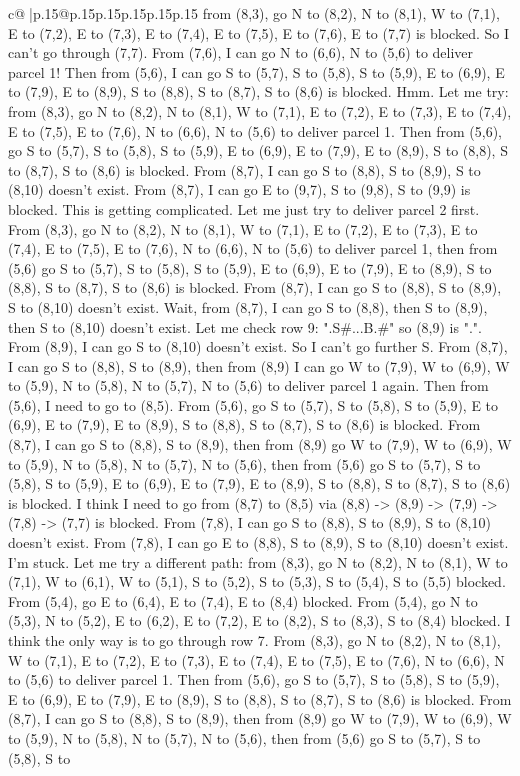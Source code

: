 \documentclass{article}
\begin{document}
{\begin{supertabular}{c@{$\;$}|p{.15\linewidth}@{}p{.15\linewidth}p{.15\linewidth}p{.15\linewidth}p{.15\linewidth}p{.15\linewidth}}
{{{from (8,3), go N to (8,2), N to (8,1), W to (7,1), E to (7,2), E to (7,3), E to (7,4), E to (7,5), E to (7,6), E to (7,7) is blocked. So I can't go through (7,7). From (7,6), I can go N to (6,6), N to (5,6) to deliver parcel 1! Then from (5,6), I can go S to (5,7), S to (5,8), S to (5,9), E to (6,9), E to (7,9), E to (8,9), S to (8,8), S to (8,7), S to (8,6) is blocked. Hmm. Let me try: from (8,3), go N to (8,2), N to (8,1), W to (7,1), E to (7,2), E to (7,3), E to (7,4), E to (7,5), E to (7,6), N to (6,6), N to (5,6) to deliver parcel 1. Then from (5,6), go S to (5,7), S to (5,8), S to (5,9), E to (6,9), E to (7,9), E to (8,9), S to (8,8), S to (8,7), S to (8,6) is blocked. From (8,7), I can go S to (8,8), S to (8,9), S to (8,10) doesn't exist. From (8,7), I can go E to (9,7), S to (9,8), S to (9,9) is blocked. This is getting complicated. Let me just try to deliver parcel 2 first. From (8,3), go N to (8,2), N to (8,1), W to (7,1), E to (7,2), E to (7,3), E to (7,4), E to (7,5), E to (7,6), N to (6,6), N to (5,6) to deliver parcel 1, then from (5,6) go S to (5,7), S to (5,8), S to (5,9), E to (6,9), E to (7,9), E to (8,9), S to (8,8), S to (8,7), S to (8,6) is blocked. From (8,7), I can go S to (8,8), S to (8,9), S to (8,10) doesn't exist. Wait, from (8,7), I can go S to (8,8), then S to (8,9), then S to (8,10) doesn't exist. Let me check row 9: ".S\#...B.\#" so (8,9) is ".". From (8,9), I can go S to (8,10) doesn't exist. So I can't go further S. From (8,7), I can go S to (8,8), S to (8,9), then from (8,9) I can go W to (7,9), W to (6,9), W to (5,9), N to (5,8), N to (5,7), N to (5,6) to deliver parcel 1 again. Then from (5,6), I need to go to (8,5). From (5,6), go S to (5,7), S to (5,8), S to (5,9), E to (6,9), E to (7,9), E to (8,9), S to (8,8), S to (8,7), S to (8,6) is blocked. From (8,7), I can go S to (8,8), S to (8,9), then from (8,9) go W to (7,9), W to (6,9), W to (5,9), N to (5,8), N to (5,7), N to (5,6), then from (5,6) go S to (5,7), S to (5,8), S to (5,9), E to (6,9), E to (7,9), E to (8,9), S to (8,8), S to (8,7), S to (8,6) is blocked. I think I need to go from (8,7) to (8,5) via (8,8) {-}> (8,9) {-}> (7,9) {-}> (7,8) {-}> (7,7) is blocked. From (7,8), I can go S to (8,8), S to (8,9), S to (8,10) doesn't exist. From (7,8), I can go E to (8,8), S to (8,9), S to (8,10) doesn't exist. I'm stuck. Let me try a different path: from (8,3), go N to (8,2), N to (8,1), W to (7,1), W to (6,1), W to (5,1), S to (5,2), S to (5,3), S to (5,4), S to (5,5) blocked. From (5,4), go E to (6,4), E to (7,4), E to (8,4) blocked. From (5,4), go N to (5,3), N to (5,2), E to (6,2), E to (7,2), E to (8,2), S to (8,3), S to (8,4) blocked. I think the only way is to go through row 7. From (8,3), go N to (8,2), N to (8,1), W to (7,1), E to (7,2), E to (7,3), E to (7,4), E to (7,5), E to (7,6), N to (6,6), N to (5,6) to deliver parcel 1. Then from (5,6), go S to (5,7), S to (5,8), S to (5,9), E to (6,9), E to (7,9), E to (8,9), S to (8,8), S to (8,7), S to (8,6) is blocked. From (8,7), I can go S to (8,8), S to (8,9), then from (8,9) go W to (7,9), W to (6,9), W to (5,9), N to (5,8), N to (5,7), N to (5,6), then from (5,6) go S to (5,7), S to (5,8), S to }}}
\end{supertabular}}
\end{document}

